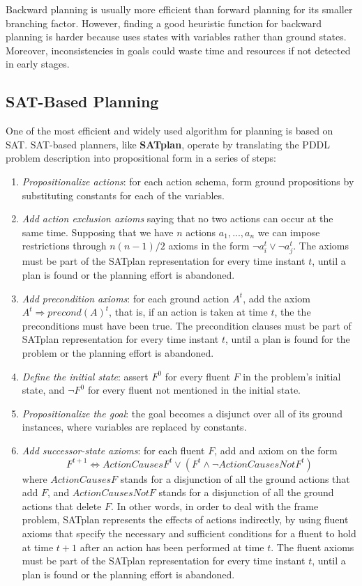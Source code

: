 \documentclass{article}
\begin{document}
Backward planning is usually more efficient than forward planning for its smaller branching factor. However, finding a good heuristic function for backward planning is harder because uses states with variables rather than ground states. Moreover, inconsistencies in goals could waste time and resources if not detected in early stages.

\subsection{SAT-Based Planning}
One of the most efficient and widely used algorithm for planning is based on SAT. SAT-based planners, like \textbf{SATplan}, operate by translating the PDDL problem description into propositional form in a series of steps:
\begin{enumerate}
    \item \textit{Propositionalize actions}: for each action schema, form ground propositions by substituting constants for each of the variables.
    
    \item \textit{Add action exclusion axioms} saying that no two actions can occur at the same time. Supposing that we have $n$ actions $a_1, ..., a_n$ we can impose restrictions through $n(n-1)/2$ axioms in the form $\neg a_i^t \lor \neg a_j^t$. The axioms must be part of the SATplan representation for every time instant $t$, until a plan is found or the planning effort is abandoned. 
    
    \item \textit{Add precondition axioms}: for each ground action $A^t$, add the axiom $A^t\Rightarrow precond(A)^t$, that is, if an action is taken at time $t$, the the preconditions must have been true. The precondition clauses must be part of SATplan representation for every time instant $t$, until a plan is found for the problem or the planning effort is abandoned.
    
    \item \textit{Define the initial state}: assert $F^0$ for every fluent $F$ in the problem's initial state, and $\neg F^0$ for every fluent not mentioned in the initial state.
    
    \item \textit{Propositionalize the goal}: the goal becomes a disjunct over all of its ground instances, where variables are replaced by constants.
    
    \item \textit{Add successor-state axioms}: for each fluent $F$, add and axiom on the form 
    \[F^{t+1} \Leftrightarrow ActionCausesF^t \lor (F^t\land \neg ActionCausesNotF^t)\]
    where $ActionCausesF$ stands for a disjunction of all the ground actions that add $F$, and $ActionCausesNotF$ stands for a disjunction of all the ground actions that delete $F$. In other words, in order to deal with the frame problem, SATplan represents the effects of actions indirectly, by using fluent axioms that specify the necessary and sufficient conditions for a fluent to hold at time $t+1$ after an action has been performed at time $t$. The fluent axioms must be part of the SATplan representation for every time instant $t$, until a plan is found or the planning effort is abandoned.
\end{enumerate}
\end{document}

